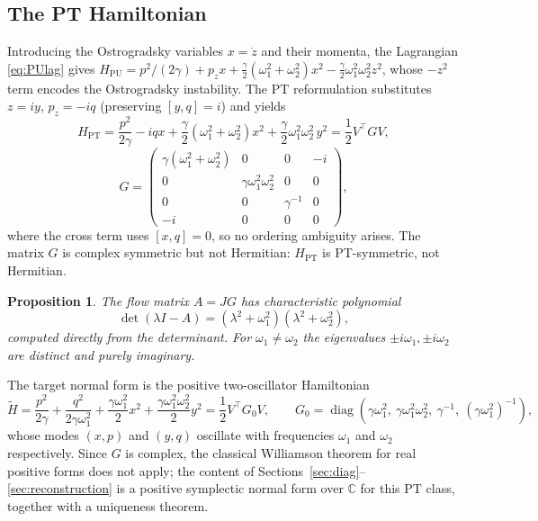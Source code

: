 \documentclass[11pt]{article}
\newtheorem{proposition}[theorem]{Proposition}
\theoremstyle{definition}
\theoremstyle{remark}
\newcommand{\C}{\mathbb{C}}
\newcommand{\w}{\omega}
\newcommand{\diag}{\operatorname{diag}}
\begin{document}
\subsection{The PT Hamiltonian}

Introducing the Ostrogradsky variables $x=\dot z$ and their momenta, the
Lagrangian \eqref{eq:PUlag} gives
$H_{\mathrm{PU}}=p^2/(2\gamma)+p_z x
+\tfrac{\gamma}{2}(\w_1^2+\w_2^2)x^2-\tfrac{\gamma}{2}\w_1^2\w_2^2 z^2$,
whose $-z^2$ term encodes the Ostrogradsky instability.  The PT reformulation
\cite{BM2008PRL,BM2008PRD} substitutes $z=iy$, $p_z=-iq$ (preserving
$[y,q]=i$) and yields
\begin{equation}\label{eq:HPT}
H_{\mathrm{PT}}
=\frac{p^2}{2\gamma}-iqx
+\frac{\gamma}{2}(\w_1^2+\w_2^2)x^2
+\frac{\gamma}{2}\w_1^2\w_2^2\,y^2
=\frac12 V^{\top}GV,
\end{equation}
\begin{equation}\label{eq:G}
G=\begin{pmatrix}
\gamma(\w_1^2+\w_2^2)&0&0&-i\\
0&\gamma\w_1^2\w_2^2&0&0\\
0&0&\gamma^{-1}&0\\
-i&0&0&0
\end{pmatrix},
\end{equation}
where the cross term uses $[x,q]=0$, so no ordering ambiguity arises.  The
matrix $G$ is complex symmetric but not Hermitian: $H_{\mathrm{PT}}$ is
PT-symmetric, not Hermitian.

\begin{proposition}\label{prop:spectrum}
The flow matrix $A=JG$ has characteristic polynomial
\begin{equation}
\det(\lambda I-A)=(\lambda^2+\w_1^2)(\lambda^2+\w_2^2),
\end{equation}
computed directly from the determinant.  For $\w_1\neq\w_2$ the eigenvalues
$\pm i\w_1,\pm i\w_2$ are distinct and purely imaginary.
\end{proposition}

The target normal form is the positive two-oscillator Hamiltonian
\begin{equation}\label{eq:G0}
\widetilde H=\frac{p^2}{2\gamma}+\frac{q^2}{2\gamma\w_1^2}
+\frac{\gamma\w_1^2}{2}x^2+\frac{\gamma\w_1^2\w_2^2}{2}y^2
=\frac12V^{\top}G_0V,
\qquad
G_0=\diag\!\left(\gamma\w_1^2,\ \gamma\w_1^2\w_2^2,\ \gamma^{-1},\
(\gamma\w_1^2)^{-1}\right),
\end{equation}
whose modes $(x,p)$ and $(y,q)$ oscillate with frequencies $\w_1$ and $\w_2$
respectively.  Since $G$ is complex, the classical Williamson theorem
\cite{Williamson1936} for real positive forms does not apply; the content of
Sections~\ref{sec:diag}--\ref{sec:reconstruction} is a positive symplectic
normal form over $\C$ for this PT class, together with a uniqueness theorem.
\end{document}
